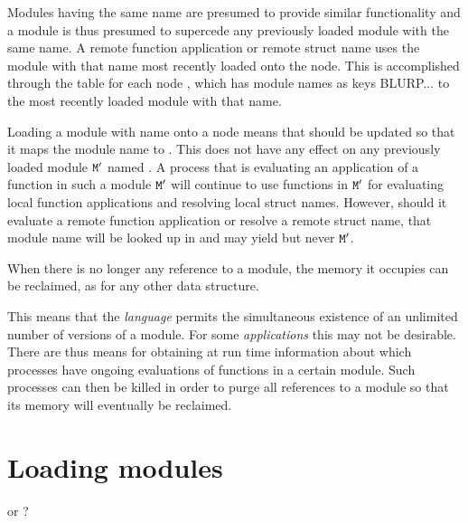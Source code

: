 Modules having the same name are presumed to provide similar
functionality and a module is thus presumed to supercede any
previously loaded module with the same name.  A remote function
application or remote struct name uses the module with that name most
recently loaded onto the node.  This is accomplished through the table
 for each node , which has module names as
keys BLURP...  to the most recently loaded module with that name.

Loading a module  with name  onto a node  means
that  should be updated so that it maps the module
name  to .  This does not have any effect on any
previously loaded module ${\tt{\sl M}}'$ named .  A process that is
evaluating an application of a function in such a module ${\tt{\sl M}}'$
will continue to use functions in ${\tt{\sl M}}'$ for evaluating local
function applications and resolving local struct names.  However,
should it evaluate a remote function application or resolve a remote
struct name, that module name will be looked up in
 and may yield  but never ${\tt{\sl M}}'$.

When there is no longer any reference to a module, the memory it
occupies can be reclaimed, as for any other data structure.

This means that the \emph{language} permits the simultaneous existence
of an unlimited number of versions of a module. For some
\emph{applications} this may not be desirable.  There are thus means
for obtaining at run time information about which processes have
ongoing evaluations of functions in a certain module. Such processes
can then be killed in order to purge all references to a module so
that its memory will eventually be reclaimed.

\section{Loading modules}

 or ?
\fi
